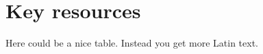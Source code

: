 \section{Key resources}
Here could be a nice table. Instead you get more Latin text. \newline
\lipsum[1-2]

